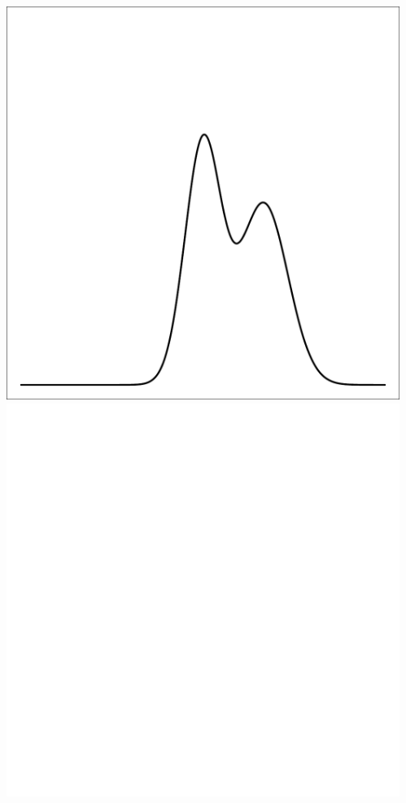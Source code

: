 \documentclass{beamer}
\begin{document}
\begin{frame}[t]
\begin{columns}[c]
\begin{flushright}
            \end{flushright}
            \begin{flushright}
                \includegraphics[width=1\textwidth]{bayesian_update_illustration_th2.pdf}\\
                \includegraphics[width=1\textwidth]{bayesian_update_illustration_blank.pdf}\\

\end{flushright}
\end{columns}
\end{frame}
\end{document}
